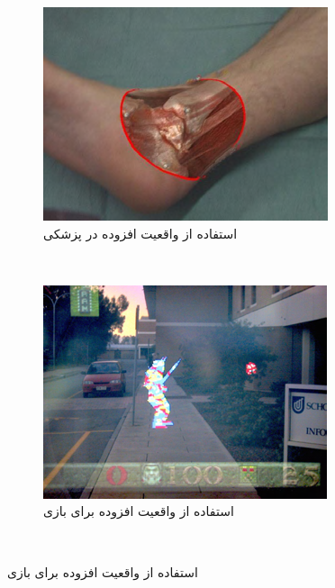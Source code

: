 	\begin{figure}
		\centering
		\begin{subfigure}[b]{0.4\textwidth}
			\includegraphics[width=\textwidth]{image/AR_in_medicine}
			\caption{استفاده از واقعیت افزوده در پزشکی
			\\
		\cite{nasir}}
			\label{fig:gull}
		\end{subfigure}
		~ %
		\begin{subfigure}[b]{0.4\textwidth}
			\includegraphics[width=\textwidth]{image/ARQuake_outdoor_AR_game}
			\caption{استفاده از واقعیت افزوده برای بازی
			\\
			\cite{serino2016pokemon}}
			\label{fig:tiger}
		\end{subfigure}
		~ %
		

\end{figure}
